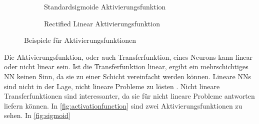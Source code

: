 \begin{figure}
  \centering
  \begin{subfigure}{.5\textwidth}
    \centering
    \caption{Standardsigmoide Aktivierungsfunktion}
    \label{fig:sigmoid}
  \end{subfigure}%
  \begin{subfigure}{.5\textwidth}
    \centering
    \caption{Rectified Linear Aktivierungsfunktion}
    \label{fig:ClippedRelu}
  \end{subfigure}
  \caption{Beispiele für Aktivierungsfunktionen}
  \label{fig:activationfunction}
\end{figure}

Die Aktivierungsfunktion, oder auch Transferfunktion, eines Neurons kann linear oder nicht linear sein. Ist die Transferfunktion linear, ergibt ein mehrschichtiges \ac{NN} keinen Sinn, da sie zu einer Schicht vereinfacht werden können. Lineare \acp{NN} sind nicht in der Lage, nicht lineare Probleme zu lösten \cite{minsky1969perceptron}. Nicht lineare Transferfunktionen sind interessanter, da sie für nicht lineare Probleme antworten liefern können. In \autoref{fig:activationfunction} sind zwei Aktivierungsfunktionen zu sehen. In \autoref{fig:sigmoid}

